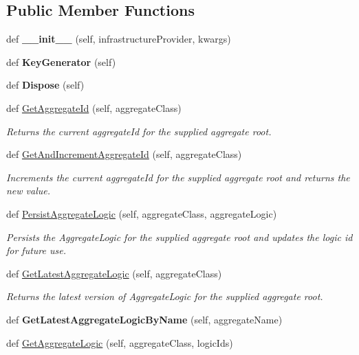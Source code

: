 \subsection*{Public Member Functions}
\begin{DoxyCompactItemize}
\item 
def {\bfseries \+\_\+\+\_\+init\+\_\+\+\_\+} (self, infrastructure\+Provider, kwargs)
\item 
def {\bfseries Key\+Generator} (self)
\item 
def {\bfseries Dispose} (self)
\item 
def \hyperlink{group__Chronos_gacf07457d7fc86a6c7288d0776a232232}{Get\+Aggregate\+Id} (self, aggregate\+Class)
\begin{DoxyCompactList}\small\item\em Returns the current aggregate\+Id for the supplied aggregate root. \end{DoxyCompactList}\item 
def \hyperlink{group__Chronos_gaf6e4ec22098eba3836bb08becb8040bd}{Get\+And\+Increment\+Aggregate\+Id} (self, aggregate\+Class)
\begin{DoxyCompactList}\small\item\em Increments the current aggregate\+Id for the supplied aggregate root and returns the new value. \end{DoxyCompactList}\item 
def \hyperlink{group__Chronos_ga631470897d4a55e95820e08484f71135}{Persist\+Aggregate\+Logic} (self, aggregate\+Class, aggregate\+Logic)
\begin{DoxyCompactList}\small\item\em Persists the Aggregate\+Logic for the supplied aggregate root and updates the logic id for future use. \end{DoxyCompactList}\item 
def \hyperlink{group__Chronos_ga651c31b6887827043503061a23dfdba7}{Get\+Latest\+Aggregate\+Logic} (self, aggregate\+Class)
\begin{DoxyCompactList}\small\item\em Returns the latest version of Aggregate\+Logic for the supplied aggregate root. \end{DoxyCompactList}\item 
def {\bfseries Get\+Latest\+Aggregate\+Logic\+By\+Name} (self, aggregate\+Name)
\item 
def \hyperlink{group__Chronos_ga99132bff35045acd67ea8d9bbc5f32c8}{Get\+Aggregate\+Logic} (self, aggregate\+Class, logic\+Ids)

\end{DoxyCompactItemize}
